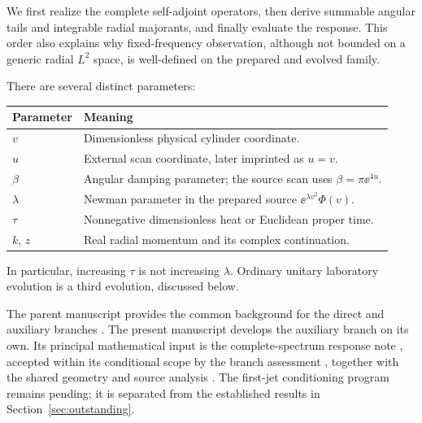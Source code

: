 We first realize the complete self-adjoint operators, then derive
summable angular tails and integrable radial majorants, and finally
evaluate the response. This order also explains why fixed-frequency
observation, although not bounded on a generic radial $L^2$ space, is
well-defined on the prepared and evolved family.

There are several distinct parameters:
\begin{center}
\begin{tabularx}{\textwidth}{@{}lY@{}}
\toprule
Parameter & Meaning \\
\midrule
$v$ & Dimensionless physical cylinder coordinate. \\
$u$ & External scan coordinate, later imprinted as $u=v$. \\
$\beta$ & Angular damping parameter; the source scan uses $\beta=\pi\ee^{4u}$. \\
$\lambda$ & Newman parameter in the prepared source $\ee^{\lambda v^2}\Phi(v)$. \\
$\tau$ & Nonnegative dimensionless heat or Euclidean proper time. \\
$k$, $z$ & Real radial momentum and its complex continuation. \\
\bottomrule
\end{tabularx}
\end{center}
In particular, increasing $\tau$ is not increasing $\lambda$. Ordinary
unitary laboratory evolution is a third evolution, discussed below.

The parent manuscript provides the common background for the direct and
auxiliary branches \cite{TNDBackground}. The present manuscript develops
the auxiliary branch on its own. Its principal mathematical input is the
complete-spectrum response note \cite{TNDAux}, accepted within its
conditional scope by the branch assessment \cite{TNDAuxReview}, together
with the shared geometry and source analysis
\cite{TNDParent,TNDSharedReview}. The first-jet conditioning program
\cite{TNDAuxConditioning} remains pending; it is separated from the
established results in Section~\ref{sec:outstanding}.
